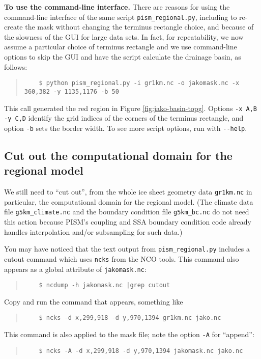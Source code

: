 \smallskip
\noindent\textbf{To use the command-line interface.}  There are reasons for using the command-line interface of the same script \texttt{pism_regional.py}, including to re-create the mask without changing the terminus rectangle choice, and because of the slowness of the GUI for large data sets.  In fact, for repeatability, we now assume a particular choice of terminus rectangle and we use command-line options to skip the GUI and have the script calculate the drainage basin, as follows:
\begin{quote}\small
\begin{verbatim}
    $ python pism_regional.py -i gr1km.nc -o jakomask.nc -x 360,382 -y 1135,1176 -b 50
\end{verbatim}
\normalsize\end{quote}
This call generated the red region in Figure \ref{fig:jako-basin-topg}.  Options \verb|-x A,B -y C,D| identify the grid indices of the corners of the terminus rectangle, and option \verb|-b| sets the border width.  To see more script options, run with \verb|--help|.

\subsection*{Cut out the computational domain for the regional model}
We still need to ``cut out'', from the whole ice sheet geometry data \verb|gr1km.nc| in particular, the computational domain for the regional model.  (The climate data file \texttt{g5km_climate.nc} and the boundary condition file \texttt{g5km_bc.nc} do not need this action because PISM's coupling and SSA boundary condition code already handles interpolation and/or subsampling for such data.)

You may have noticed that the text output from \texttt{pism_regional.py} includes a cutout command which uses \texttt{ncks} from the NCO tools.  This command also appears as a global attribute of \texttt{jakomask.nc}:
\begin{quote}\small
\begin{verbatim}
    $ ncdump -h jakomask.nc |grep cutout
\end{verbatim}
\normalsize\end{quote}
Copy and run the command that appears, something like
\begin{quote}\small
\begin{verbatim}
    $ ncks -d x,299,918 -d y,970,1394 gr1km.nc jako.nc
\end{verbatim}
\normalsize\end{quote}
This command is also applied to the mask file; note the option \verb|-A| for ``append'':
\begin{quote}\small
\begin{verbatim}
    $ ncks -A -d x,299,918 -d y,970,1394 jakomask.nc jako.nc
\end{verbatim}
\normalsize\end{quote}

